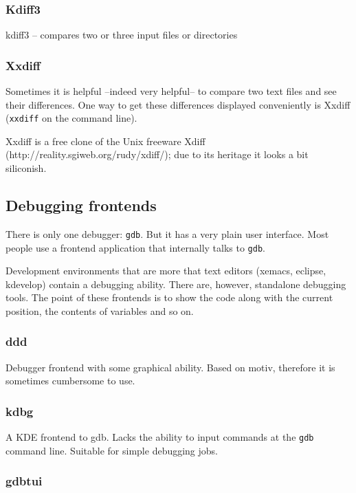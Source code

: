 \subsubsection{Kdiff3}

kdiff3 -- compares two or three input files or directories

\subsubsection{Xxdiff}

Sometimes it is helpful --indeed very helpful-- to compare two text
files and see their differences. One way to get these differences
displayed conveniently is Xxdiff (\texttt{xxdiff} on the command line).

Xxdiff is a free clone of the Unix freeware Xdiff (http://reality.sgiweb.org/rudy/xdiff/);
due to its heritage it looks a bit siliconish.






\subsection{Debugging frontends}

There is only one debugger: \texttt{gdb}. But it has a very plain
user interface. Most people use a frontend application that internally
talks to \texttt{gdb}.

Development environments that are more that text editors (xemacs,
eclipse, kdevelop) contain a debugging ability. There are, however,
standalone debugging tools. The point of these frontends is to show
the code along with the current position, the contents of variables
and so on.


\subsubsection{ddd}

Debugger frontend with some graphical ability. Based on motiv, therefore
it is sometimes cumbersome to use.


\subsubsection{kdbg}

A KDE frontend to gdb. Lacks the ability to input commands at the
\texttt{gdb} command line. Suitable for simple debugging jobs.


\subsubsection{gdbtui}

